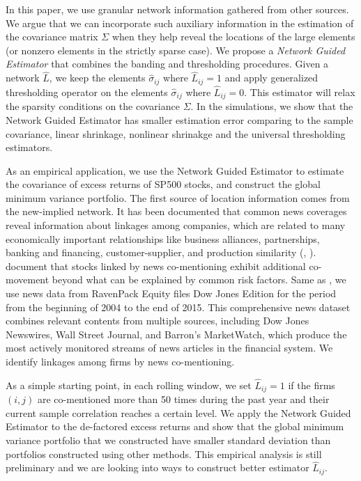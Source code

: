 
In this paper, we use granular network information gathered from other sources. We argue that we can incorporate such auxiliary information in the estimation of the covariance matrix \(\Sigma\) when they help reveal the locations of the large elements (or nonzero elements in the strictly sparse case). We propose a \textit{Network Guided Estimator} that combines the banding and thresholding procedures. Given a network \(\hat{L}\), we keep the elements \(\hat{\sigma}_{ij}\) where \(\hat{L}_{ij} =1\) and apply generalized thresholding operator on the elements \(\hat{\sigma}_{ij}\) where \(\hat{L}_{ij} = 0\). This estimator will relax the sparsity conditions on the covariance \(\Sigma\). In the simulations, we show that the Network Guided Estimator has smaller estimation error comparing to the sample covariance, linear shrinkage, nonlinear shrinakge and the universal thresholding estimators. 

As an empirical application, we use the Network Guided Estimator to estimate the covariance of excess returns of SP500 stocks, and construct the global minimum variance portfolio. The first source of location information comes from the new-implied network. It has been documented that common news coverages reveal information about linkages among companies, which are related to many economically important relationships like business alliances, partnerships, banking and financing, customer-supplier, and production similarity (\cite{scherbina2015economic}, \cite{schwenkler2019network}). \cite{ge2021news} document that stocks linked by news co-mentioning exhibit additional co-movement beyond what can be explained by common risk factors. Same as \cite{ge2021news}, we use news data from RavenPack Equity files Dow Jones Edition for the period from the beginning of 2004 to the end of 2015. This comprehensive news dataset combines relevant contents from multiple sources, including Dow Jones Newswires, Wall Street Journal, and Barron’s  MarketWatch, which produce the most actively monitored streams of news articles in the financial system. We identify linkages among firms by news co-mentioning. 

As a simple starting point, in each rolling window, we set \(\hat{L}_{ij} = 1\) if the firms \((i,j)\) are co-mentioned more than 50 times during the past year and their current sample correlation reaches a certain level. We apply the Network Guided Estimator to the de-factored excess returns and show that the global minimum variance portfolio that we constructed have smaller standard deviation than portfolios constructed using other methods. This empirical analysis is still preliminary and we are looking into ways to construct better estimator \(\hat{L}_{ij}\). 

